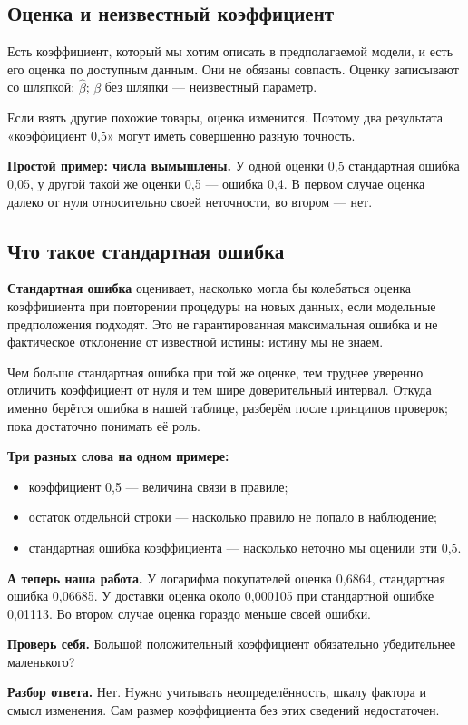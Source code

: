 \documentclass[12pt,a4paper]{article}
\newcommand{\toy}[1]{\par\textbf{Простой пример: числа вымышлены.} #1\par}
\newcommand{\ours}[1]{\par\textbf{А теперь наша работа.} #1\par}
\newcommand{\check}[2]{\par\textbf{Проверь себя.} #1\par\textbf{Разбор ответа.} #2\par}
\begin{document}
\subsection{Оценка и неизвестный коэффициент}

Есть коэффициент, который мы хотим описать в предполагаемой модели, и есть его оценка по доступным данным. Они не обязаны совпасть. Оценку записывают со шляпкой: $\widehat\beta$; $\beta$ без шляпки --- неизвестный параметр.

Если взять другие похожие товары, оценка изменится. Поэтому два результата «коэффициент 0,5» могут иметь совершенно разную точность.

\toy{У одной оценки 0,5 стандартная ошибка 0,05, у другой такой же оценки 0,5 --- ошибка 0,4. В первом случае оценка далеко от нуля относительно своей неточности, во втором --- нет.}

\subsection{Что такое стандартная ошибка}

\textbf{Стандартная ошибка} оценивает, насколько могла бы колебаться оценка коэффициента при повторении процедуры на новых данных, если модельные предположения подходят. Это не гарантированная максимальная ошибка и не фактическое отклонение от известной истины: истину мы не знаем.

Чем больше стандартная ошибка при той же оценке, тем труднее уверенно отличить коэффициент от нуля и тем шире доверительный интервал. Откуда именно берётся ошибка в нашей таблице, разберём после принципов проверок; пока достаточно понимать её роль.

\textbf{Три разных слова на одном примере:}
\begin{itemize}
\item коэффициент 0,5 --- величина связи в правиле;
\item остаток отдельной строки --- насколько правило не попало в наблюдение;
\item стандартная ошибка коэффициента --- насколько неточно мы оценили эти 0,5.
\end{itemize}

\ours{У логарифма покупателей оценка 0,6864, стандартная ошибка 0,06685. У доставки оценка около 0,000105 при стандартной ошибке 0,01113. Во втором случае оценка гораздо меньше своей ошибки.}

\check{Большой положительный коэффициент обязательно убедительнее маленького?}{Нет. Нужно учитывать неопределённость, шкалу фактора и смысл изменения. Сам размер коэффициента без этих сведений недостаточен.}
\end{document}
